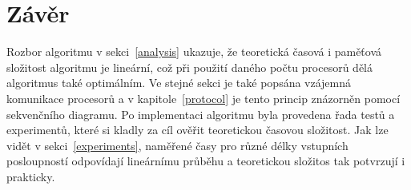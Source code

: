 \documentclass[a4paper, 12pt]{article}[21.3.2015]
\begin{document}
\section{Závěr}\label{conclusion}
Rozbor algoritmu v sekci~\ref{analysis} ukazuje, že teoretická časová i paměťová složitost algoritmu je lineární, což při použití daného počtu procesorů dělá algoritmus také optimálním. Ve stejné sekci je také popsána vzájemná komunikace procesorů a v kapitole~\ref{protocol} je tento princip znázorněn pomocí sekvenčního diagramu. Po implementaci algoritmu byla provedena řada testů a experimentů, které si kladly za cíl ověřit teoretickou časovou složitost. Jak lze vidět v sekci~\ref{experiments}, naměřené časy pro různé délky vstupních posloupností odpovídají lineárnímu průběhu a teoretickou složitos tak potvrzují i prakticky.
\end{document}
